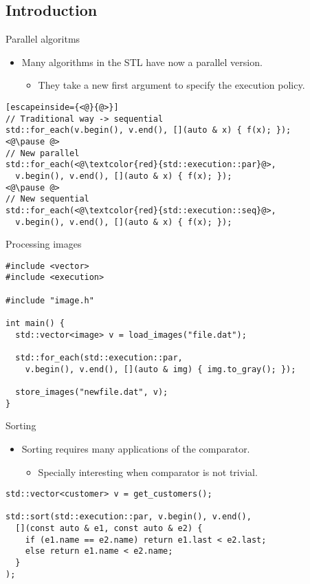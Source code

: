 \subsection{Introduction}

\begin{frame}[t,fragile]{Parallel algoritms}
\begin{itemize}
  \item Many algorithms in the STL have now
        a parallel version.
    \begin{itemize}
      \item They take a new first argument to
            specify the execution policy.
    \end{itemize}
\end{itemize}
\begin{lstlisting}[escapeinside={<@}{@>}]
// Traditional way -> sequential
std::for_each(v.begin(), v.end(), [](auto & x) { f(x); });
<@\pause @>
// New parallel
std::for_each(<@\textcolor{red}{std::execution::par}@>,
  v.begin(), v.end(), [](auto & x) { f(x); });
<@\pause @>
// New sequential
std::for_each(<@\textcolor{red}{std::execution::seq}@>,
  v.begin(), v.end(), [](auto & x) { f(x); });
\end{lstlisting}
\end{frame}

\begin{frame}[t,fragile]{Processing images}
\begin{lstlisting}
#include <vector>
#include <execution>

#include "image.h"

int main() {
  std::vector<image> v = load_images("file.dat");

  std::for_each(std::execution::par,
    v.begin(), v.end(), [](auto & img) { img.to_gray(); });

  store_images("newfile.dat", v);
}
\end{lstlisting}
\end{frame}

\begin{frame}[t,fragile]{Sorting}
\begin{itemize}
  \item Sorting requires many applications of the comparator.
    \begin{itemize}
      \item Specially interesting when comparator is not trivial.
    \end{itemize}
\end{itemize}
\begin{lstlisting}
std::vector<customer> v = get_customers();

std::sort(std::execution::par, v.begin(), v.end(),
  [](const auto & e1, const auto & e2) {
    if (e1.name == e2.name) return e1.last < e2.last;
    else return e1.name < e2.name;
  }
);
\end{lstlisting}
\end{frame}
